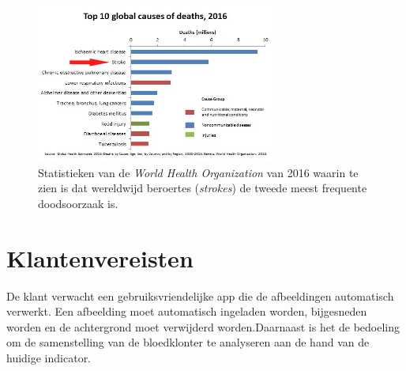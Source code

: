 \documentclass[a4paper,kulak]{kulakarticle}
\begin{document}
	\begin{figure}[H]
		\centering
		\includegraphics[width = 0.7\textwidth]{top10doodsoorzaken.png}
	
		\caption{Statistieken van de \textit{World Health Organization} van 2016 waarin te zien is dat wereldwijd beroertes (\textit{strokes}) de tweede meest frequente doodsoorzaak is.}
		\label{figuur doodsoorzaken}
	\end{figure}

\pagebreak
\newpage

\tableofcontents

\newpage

\section{Klantenvereisten}
De klant verwacht een gebruiksvriendelijke app die de afbeeldingen automatisch verwerkt. Een afbeelding moet automatisch ingeladen worden, bijgesneden worden en de achtergrond moet verwijderd worden.Daarnaast is het de bedoeling om de samenstelling van de bloedklonter te analyseren aan de hand van de huidige indicator.
\end{document}

